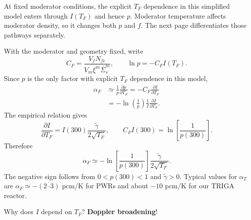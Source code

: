 \documentclass[compact]{ne630handout}
\newcommand{\NEDopplerFigure}{%
\begin{tikzpicture}[x=1cm,y=1cm,>=Stealth,line width=0.65pt,
  every node/.style={font=\fontsize{8}{9}\selectfont}]
  \draw[->] (0,2.25)--(0,4.18) node[above] {$\sigma_a(E)$};
  \draw[->] (0,2.25)--(6.7,2.25) node[right] {$E$};
  \draw[ksupurple,domain=.12:6.45,samples=140,smooth]
    plot (\x,{2.42+1.42*exp(-((\x-3.2)/.30)^2)});
  \draw[orange,dashed,domain=.12:6.45,samples=140,smooth]
    plot (\x,{2.42+.73*exp(-((\x-3.2)/.63)^2)});
  \draw[->] (0,0)--(0,1.70) node[above] {$\varphi_f(E)/\varphi_m(E)$};
  \draw[->] (0,0)--(6.7,0) node[right] {$E$};
  \draw[ksupurple,domain=.12:6.45,samples=140,smooth]
    plot (\x,{1.36-1.04*exp(-((\x-3.2)/.38)^2)});
  \draw[orange,dashed,domain=.12:6.45,samples=140,smooth]
    plot (\x,{1.36-.77*exp(-((\x-3.2)/.79)^2)});
  \draw[ksupurple] (.35,-.45)--(.95,-.45);
  \node[anchor=west] at (1.0,-.45) {cooler fuel};
  \draw[orange,dashed] (3.45,-.45)--(4.05,-.45);
  \node[anchor=west] at (4.1,-.45) {hotter fuel};
\end{tikzpicture}}
\begin{document}
\vspace{10pt}


At fixed moderator conditions, the explicit $T_F$ dependence in this simplified model enters through $I(T_F)$ and hence $p$. Moderator temperature affects moderator density, so it changes both $p$ and $f$. The next page differentiates those pathways separately.

\colend

\newpage
{}
\colstart
{}
With the moderator and geometry fixed, write
$$
 C_F=\frac{V_fN_{fe}}{V_m\xi^m\bar\Sigma_s^m},\qquad
 \ln p=-C_F I(T_F).
$$
Since $p$ is the only factor with explicit $T_F$ dependence in this model,
\begin{align*}
 \alpha_F&\simeq\frac1p\frac{\partial p}{\partial T_F}
 =-C_F\frac{\partial I}{\partial T_F}\\
 &=-\ln\!\left(\frac1p\right)\frac1I
 \frac{\partial I}{\partial T_F}.
\end{align*}
The empirical relation gives
$$
 \frac{\partial I}{\partial T_F}
 =I(300)\frac{\tilde\gamma}{2\sqrt{T_F}},\qquad
 C_F I(300)=\ln\!\left[\frac1{p(300)}\right].
$$
Therefore
$$
 \boxed{\alpha_F\simeq-\ln\!\left[\frac1{p(300)}\right]
 \frac{\tilde\gamma}{2\sqrt{T_F}}.}
$$
The negative sign follows from $0<p(300)<1$ and $\tilde\gamma>0$. Typical values for $\alpha_T$ are $\alpha_F\simeq-(2\text{--}3)$ pcm/K for PWRs and about $-10$ pcm/K for our TRIGA reactor.

\vspace{10pt}

Why does $I$ depend on $T_F$? {\bf Doppler broadening}!


\end{document}
